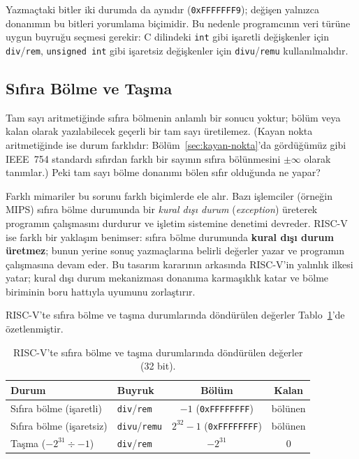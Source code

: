 \begin{ornek}[5.14]
Yazmaçtaki bitler iki durumda da aynıdır (\texttt{0xFFFFFFF9}); değişen yalnızca donanımın bu bitleri yorumlama biçimidir. Bu nedenle programcının veri türüne uygun buyruğu seçmesi gerekir: C dilindeki \texttt{int} gibi işaretli değişkenler için \texttt{div}/\texttt{rem}, \texttt{unsigned int} gibi işaretsiz değişkenler için \texttt{divu}/\texttt{remu} kullanılmalıdır.
\end{ornek}


\subsection{Sıfıra Bölme ve Taşma}
\label{sec:sifira-bolme}

Tam sayı aritmetiğinde sıfıra bölmenin anlamlı bir sonucu yoktur; bölüm veya kalan olarak yazılabilecek geçerli bir tam sayı üretilemez. (Kayan nokta aritmetiğinde ise durum farklıdır: Bölüm~\ref{sec:kayan-nokta}'da gördüğümüz gibi IEEE~754 standardı sıfırdan farklı bir sayının sıfıra bölünmesini $\pm\infty$ olarak tanımlar.) Peki tam sayı bölme donanımı bölen sıfır olduğunda ne yapar?

Farklı mimariler bu sorunu farklı biçimlerde ele alır. Bazı işlemciler (örneğin MIPS) sıfıra bölme durumunda bir \emph{kural dışı durum} (\emph{exception}) üreterek programın çalışmasını durdurur ve işletim sistemine denetimi devreder. RISC-V ise farklı bir yaklaşım benimser: sıfıra bölme durumunda \textbf{kural dışı durum üretmez}; bunun yerine sonuç yazmaçlarına belirli değerler yazar ve programın çalışmasına devam eder. Bu tasarım kararının arkasında RISC-V'in yalınlık ilkesi yatar; kural dışı durum mekanizması donanıma karmaşıklık katar ve bölme biriminin boru hattıyla uyumunu zorlaştırır.

RISC-V'te sıfıra bölme ve taşma durumlarında döndürülen değerler Tablo~\ref{tab:sifira-bolme}'de özetlenmiştir.

\begin{table}[htbp]
\centering
\caption[Sıfıra bölme ve taşma sonuçları]{RISC-V'te sıfıra bölme ve taşma durumlarında döndürülen değerler (32 bit).}
\label{tab:sifira-bolme}
\small
\begin{tabular}{l l c c}
\toprule
\textbf{Durum} & \textbf{Buyruk} & \textbf{Bölüm} & \textbf{Kalan} \\
\midrule
Sıfıra bölme (işaretli) & \texttt{div}/\texttt{rem} & $-1$ (\texttt{0xFFFFFFFF}) & bölünen \\
Sıfıra bölme (işaretsiz) & \texttt{divu}/\texttt{remu} & $2^{32}-1$ (\texttt{0xFFFFFFFF}) & bölünen \\
Taşma ($-2^{31} \div -1$) & \texttt{div}/\texttt{rem} & $-2^{31}$ & $0$ \\
\bottomrule
\end{tabular}
\end{table}

